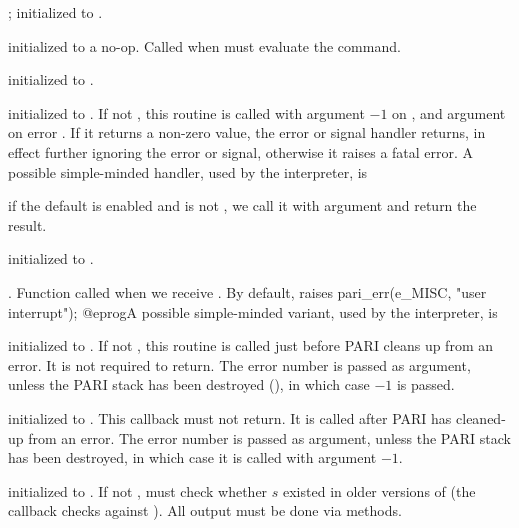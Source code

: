 ;
initialized to .

initialized to a no-op. Called when  must evaluate the 
command.

initialized to .

initialized to . If not , this routine is called with
argument $-1$ on , and argument  on error . If
it returns a non-zero value, the error or signal handler returns, in effect
further ignoring the error or signal, otherwise it raises a fatal error.
A possible simple-minded handler, used by the  interpreter, is

 if the 
default is enabled and  is not , we call it
with  argument and return the result.

initialized to .

.
Function called when we receive . By default, raises
\bprog
  pari_err(e_MISC, "user interrupt");
@eprog\noindent A possible simple-minded variant, used by the
 interpreter, is


initialized to . If not , this routine is called just
before PARI cleans up from an error. It is not required to return.  The error
number is passed as argument, unless the PARI stack has been destroyed
(), in which case $-1$ is passed.

initialized to . This callback must not return.
It is called after PARI has cleaned-up from an error. The error number is
passed as argument, unless the PARI stack has been destroyed, in which case
it is called with argument $-1$.

 initialized to . If not , must check whether $s$
existed in older versions of  (the  callback checks against
). All output must be done via  methods.

